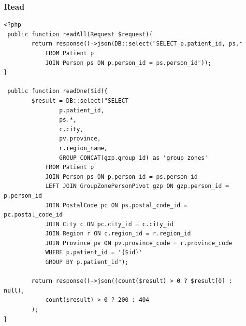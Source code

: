 \documentclass{article}
\begin{document}
\subsubsection{Read}
\begin{verbatim}
<?php
 public function readAll(Request $request){
        return response()->json(DB::select("SELECT p.patient_id, ps.*
            FROM Patient p
            JOIN Person ps ON p.person_id = ps.person_id"));
}

 public function readOne($id){
        $result = DB::select("SELECT
                p.patient_id,
                ps.*,
                c.city,
                pv.province,
                r.region_name,
                GROUP_CONCAT(gzp.group_id) as 'group_zones'
            FROM Patient p
            JOIN Person ps ON p.person_id = ps.person_id
            LEFT JOIN GroupZonePersonPivot gzp ON gzp.person_id = p.person_id
            JOIN PostalCode pc ON ps.postal_code_id = pc.postal_code_id
            JOIN City c ON pc.city_id = c.city_id
            JOIN Region r ON c.region_id = r.region_id
            JOIN Province pv ON pv.province_code = r.province_code
            WHERE p.patient_id = '{$id}'
            GROUP BY p.patient_id");

        return response()->json((count($result) > 0 ? $result[0] : null),
            count($result) > 0 ? 200 : 404
        );
}

\end{verbatim}
\end{document}
